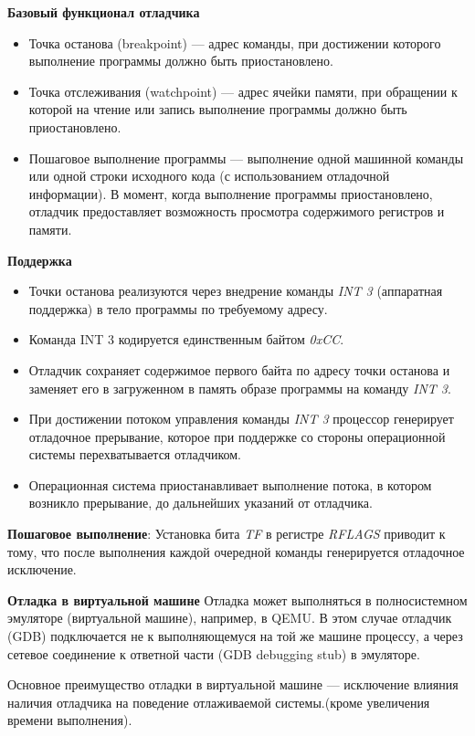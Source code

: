 \textbf{Базовый функционал отладчика}
\begin{itemize}
    \item Точка останова (breakpoint) — адрес команды, при достижении которого выполнение программы должно быть приостановлено.
    \item Точка отслеживания (watchpoint) — адрес ячейки памяти, при обращении к которой на чтение или запись выполнение программы должно быть приостановлено.
    \item  Пошаговое выполнение программы — выполнение одной машинной команды или одной строки исходного кода (с использованием отладочной информации).  В момент, когда выполнение программы приостановлено, отладчик предоставляет возможность просмотра содержимого регистров и памяти.
\end{itemize}
\textbf{Поддержка}
\begin{itemize}
    \item Точки останова реализуются через внедрение команды \textit{INT 3} (аппаратная поддержка) в тело программы по требуемому адресу.
    \item Команда INT 3 кодируется единственным байтом \textit{0xCC}.
    \item Отладчик сохраняет содержимое первого байта по адресу точки останова и заменяет его в загруженном в память образе программы на команду \textit{INT 3}.
    \item При достижении потоком управления команды \textit{INT 3} процессор генерирует отладочное прерывание, которое при поддержке со стороны операционной системы перехватывается отладчиком.
    \item Операционная система приостанавливает выполнение потока, в котором возникло прерывание, до дальнейших указаний от отладчика.
\end{itemize}

\textbf{Пошаговое выполнение}: Установка бита \textit{TF} в регистре \textit{RFLAGS} приводит к тому, что после выполнения каждой очередной команды генерируется отладочное исключение.

\textbf{Отладка в виртуальной машине}
Отладка может выполняться в полносистемном эмуляторе (виртуальной машине), например, в QEMU. В этом случае отладчик (GDB) подключается не к выполняющемуся на той же машине процессу, а через сетевое соединение к ответной части (GDB debugging stub) в эмуляторе.

Основное преимущество отладки в виртуальной машине — исключение влияния наличия отладчика на поведение отлаживаемой системы.(кроме увеличения времени выполнения).

